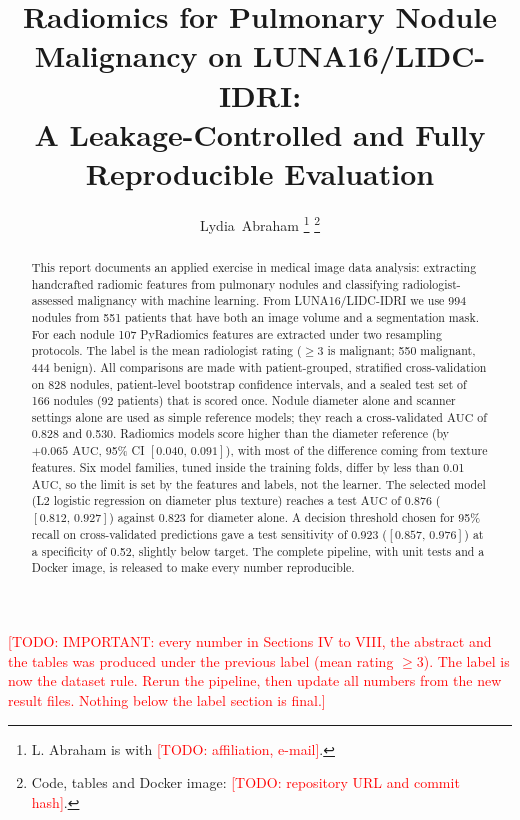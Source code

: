 \documentclass[journal]{IEEEtran}
\newcommand{\TODO}[1]{\textcolor{red}{[TODO: #1]}}
\newcommand{\auc}{\mathrm{AUC}}
\newcommand{\ci}[2]{[#1,\,#2]}            %
\begin{document}
\title{Radiomics for Pulmonary Nodule Malignancy on LUNA16/LIDC-IDRI:\\
A Leakage-Controlled and Fully Reproducible Evaluation}

\author{Lydia~Abraham%
\thanks{L. Abraham is with \TODO{affiliation, e-mail}.}%
\thanks{Code, tables and Docker image: \TODO{repository URL and commit hash}.}}


\maketitle

\TODO{IMPORTANT: every number in Sections IV to VIII, the abstract and the tables was produced under the previous label (mean rating $\geq 3$). The label is now the dataset rule. Rerun the pipeline, then update all numbers from the new result files. Nothing below the label section is final.}

\begin{abstract}
This report documents an applied exercise in medical image data analysis: extracting handcrafted radiomic
features from pulmonary nodules and classifying radiologist-assessed malignancy with machine learning. From LUNA16/LIDC-IDRI we use 994 nodules from
551 patients that have both an image volume and a segmentation mask. For each nodule 107 PyRadiomics
features are extracted under two resampling protocols. The label is the mean radiologist rating
($\geq 3$ is malignant; 550 malignant, 444 benign). All comparisons are made with patient-grouped,
stratified cross-validation on 828 nodules, patient-level bootstrap confidence intervals, and a
sealed test set of 166 nodules (92 patients) that is scored once. Nodule diameter alone and scanner settings alone are used as simple reference models; they reach a
cross-validated $\auc$ of 0.828 and 0.530. Radiomics models score higher than the diameter reference
(by $+0.065$ $\auc$, 95\% CI $\ci{0.040}{0.091}$), with most of the difference coming from texture features. Six model families, tuned inside the training folds, differ by
less than 0.01 $\auc$, so the limit is set by the features and labels, not the learner. The selected
model (L2 logistic regression on diameter plus texture) reaches a test $\auc$ of 0.876
($\ci{0.812}{0.927}$) against 0.823 for diameter alone. A decision threshold chosen for 95\% recall on
cross-validated predictions gave a test sensitivity of 0.923 ($\ci{0.857}{0.976}$) at a specificity of
0.52, slightly below target. The complete pipeline, with unit tests and a Docker image, is released
to make every number reproducible.
\end{abstract}
\end{document}
